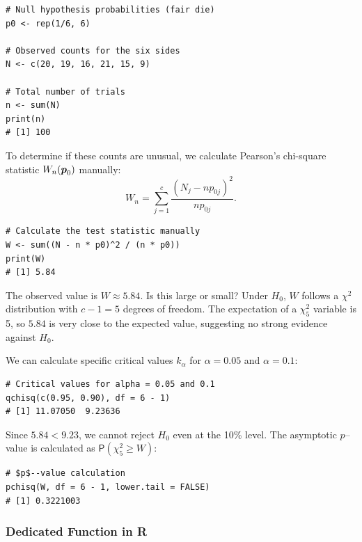 \begin{verbatim}
# Null hypothesis probabilities (fair die)
p0 <- rep(1/6, 6)

# Observed counts for the six sides
N <- c(20, 19, 16, 21, 15, 9)

# Total number of trials
n <- sum(N)
print(n)
# [1] 100
\end{verbatim}

To determine if these counts are unusual, we calculate Pearson's chi-square statistic $W_n(\boldsymbol{p}_0)$ manually:
\[
    W_n = \sum\limits_{j=1}^c \frac{(N_j - n p_{0j})^2}{n p_{0j}}.
\]

\begin{verbatim}
# Calculate the test statistic manually
W <- sum((N - n * p0)^2 / (n * p0))
print(W)
# [1] 5.84
\end{verbatim}

The observed value is $W \approx 5.84$. Is this large or small? Under $H_0$, $W$ follows a $\chi^2$ distribution with $c-1 = 5$ degrees of freedom. The expectation of a $\chi^2_5$ variable is 5, so $5.84$ is very close to the expected value, suggesting no strong evidence against $H_0$.

We can calculate specific critical values $k_\alpha$ for $\alpha = 0.05$ and $\alpha = 0.1$:

\begin{verbatim}
# Critical values for alpha = 0.05 and 0.1
qchisq(c(0.95, 0.90), df = 6 - 1)
# [1] 11.07050  9.23636
\end{verbatim}

Since $5.84 < 9.23$, we cannot reject $H_0$ even at the 10\% level. The asymptotic $p$--value is calculated as $\mathsf{P}(\chi^2_5 \ge W)$:

\begin{verbatim}
# $p$--value calculation
pchisq(W, df = 6 - 1, lower.tail = FALSE)
# [1] 0.3221003
\end{verbatim}

\subsubsection{Dedicated Function in R}
\label{sub:Dedicated_Function}

